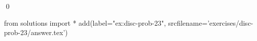 
\begin{ex} 
  \label{ex:disc-prob-23}
  
  \qed
\end{ex} 
\begin{python0}
from solutions import *
add(label="ex:disc-prob-23",
    srcfilename='exercises/disc-prob-23/answer.tex') 
\end{python0}
